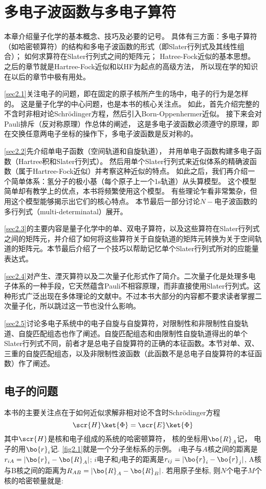 
\chapter{多电子波函数与多电子算符}
\label{chap2}
本章介绍量子化学的基本概念、技巧及必要的记号。
具体有三方面：多电子算符（如哈密顿算符）的结构和多电子波函数的形式（即Slater行列式及其线性组合）；
如何求算符在Slater行列式之间的矩阵元；
Hatree-Fock近似的基本思想。
之后的章节就是Hartree-Fock近似和以HF为起点的高级方法，
所以现在学的知识在以后的章节中极有用处。


\autoref{sec2.1}关注电子的问题，即在固定的原子核所产生的场中，电子的行为是怎样的。
这是量子化学的中心问题，也是本书的核心关注点。
如此，首先介绍完整的不含时非相对论Schr\"odinger方程，然后引入Born-Oppenhermer近似。
接下来会对Pauli排斥（反对称原理）作总体的阐述，
这是多电子波函数必须遵守的原理，即在交换任意两电子坐标的操作下，多电子波函数是反对称的。

\autoref{sec2.2}先介绍单电子函数（空间轨道和自旋轨道），
并用单电子函数构建多电子函数（Hartree积和Slater行列式）。
然后用单个Slater行列式来近似体系的精确波函数（属于Hartree-Fock近似）并考察这种近似的特点。
如此之后，我们再介绍一个简单体系：氢分子的极小基（每个原子上一个1s轨道）从头算模型。
这个模型简单却有教学上的优点，本书将频繁使用这个模型。
有些理论乍看非常繁杂，但用这个模型能够揭示出它们的核心特点。
本节最后一部分讨论$N-$电子波函数的多行列式（multi-determinatal）展开。

\autoref{sec2.3}的主要内容是量子化学中的单、双电子算符，以及这些算符在Slater行列式之间的矩阵元，并介绍了如何将这些算符关于自旋轨道的矩阵元转换为关于空间轨道的矩阵元。本节最后介绍了一个技巧以帮助记忆单个Slater行列式所对的应能量表达式。

\autoref{sec2.4}对产生、湮灭算符以及二次量子化形式作了简介。二次量子化是处理多电子体系的一种手段，它天然蕴含Pauli不相容原理，而非直接使用Slater行列式。这种形式广泛出现在多体理论的文献中。不过本书大部分的内容都不要求读者掌握二次量子化，所以跳过这一节也没什么影响。

\autoref{sec2.5}讨论多电子系统中的电子自旋与自旋算符，对限制性和非限制性自旋轨道、自旋匹配组态也作了阐述。自旋匹配组态和由限制性自旋轨道得出的单个Slater行列式不同，前者才是总电子自旋算符的正确的本征函数。本节对单、双、三重的自旋匹配组态，以及非限制性波函数（此函数不是总电子自旋算符的本征函数）作了阐述。

\section{电子的问题}
\label{sec2.1}
本书的主要关注点在于如何近似求解非相对论不含时Schr\"odinger方程
\begin{equation}
\label{2.1}
\scr{H}\ket{\Phi}=\scr{E}\ket{\Phi}
\end{equation}
其中$\scr{H}$是核和电子组成的系统的哈密顿算符，
核的坐标用$\bo{R}_A$记，
电子的用$\bo{r}_i$记. 
\autoref{fig2.1}就是一个分子坐标系的示例。
$i$电子与$A$核之间的距离是$r_{iA}=|\bo{r}_i-\bo{R}_A|$; 
$i$电子和$j$电子的距离是$r_{ij}=|\bo{r}_i-\bo{r}_j|$, 
A核与B核之间的距离为$R_{AB}=|\bo{R}_A-\bo{R}_B|$.
若用原子坐标,
则$N$个电子$M$个核的哈密顿量就是:


